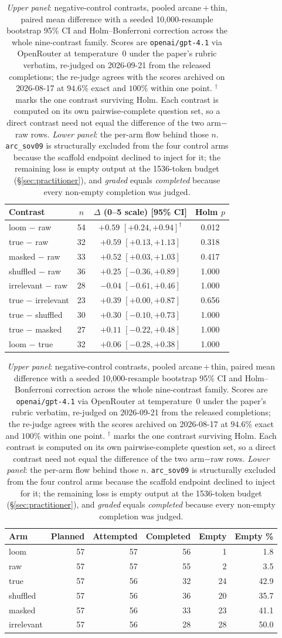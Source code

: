 \documentclass[10pt,twocolumn]{article}
\begin{document}
\begin{table}[t]\centering\small
\caption{\emph{Upper panel}: negative-control contrasts, pooled arcane\,$+$\,thin, paired mean
difference with a seeded 10{,}000-resample bootstrap 95\% CI and Holm--Bonferroni correction across
the whole nine-contrast family. Scores are \texttt{openai/gpt-4.1} via OpenRouter at temperature~0
under the paper's rubric verbatim, re-judged on 2026-09-21 from the released completions; the
re-judge agrees with the scores archived on 2026-08-17 at $94.6\%$ exact and $100\%$ within one
point. $^{\dagger}$ marks the one contrast surviving Holm. Each contrast is computed on its own
pairwise-complete question set, so a direct contrast need not equal the difference of the two
arm$-$raw rows. \emph{Lower panel}: the per-arm flow behind those $n$. \texttt{arc\_sov09} is
structurally excluded from the four control arms because the scaffold endpoint declined to inject for
it; the remaining loss is empty output at the 1536-token budget (\S\ref{sec:practitioner}), and
\emph{graded} equals \emph{completed} because every non-empty completion was judged.}
\label{tab:controls}
\begin{tabular}{lccc}
\toprule
Contrast & $n$ & $\Delta$ (0--5 scale) [95\% CI] & Holm $p$ \\
\midrule
loom $-$ raw        & 54 & $+0.59$ $[+0.24,+0.94]^{\dagger}$ & 0.012 \\
true $-$ raw        & 32 & $+0.59$ $[+0.13,+1.13]$ & 0.318 \\
masked $-$ raw      & 33 & $+0.52$ $[+0.03,+1.03]$ & 0.417 \\
shuffled $-$ raw    & 36 & $+0.25$ $[-0.36,+0.89]$ & 1.000 \\
irrelevant $-$ raw  & 28 & $-0.04$ $[-0.61,+0.46]$ & 1.000 \\
true $-$ irrelevant & 23 & $+0.39$ $[+0.00,+0.87]$ & 0.656 \\
true $-$ shuffled   & 30 & $+0.30$ $[-0.10,+0.73]$ & 1.000 \\
true $-$ masked     & 27 & $+0.11$ $[-0.22,+0.48]$ & 1.000 \\
loom $-$ true       & 32 & $+0.06$ $[-0.28,+0.38]$ & 1.000 \\
\bottomrule
\end{tabular}

\vspace{8pt}
\begin{tabular}{lrrrrr}
\toprule
Arm & Planned & Attempted & Completed & Empty & Empty \% \\
\midrule
loom        & 57 & 57 & 56 &  1 & 1.8 \\
raw         & 57 & 57 & 55 &  2 & 3.5 \\
true        & 57 & 56 & 32 & 24 & 42.9 \\
shuffled    & 57 & 56 & 36 & 20 & 35.7 \\
masked      & 57 & 56 & 33 & 23 & 41.1 \\
irrelevant  & 57 & 56 & 28 & 28 & 50.0 \\
\bottomrule
\end{tabular}
\end{table}
\end{document}
